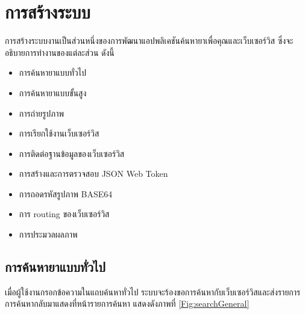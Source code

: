 \chapter{การสร้างระบบ}
การสร้างระบบงานเป็นส่วนหนึ่งของการพัฒนาแอปพลิเคชันค้นหายาเพื่อคุณและเว็บเซอร์วิส ซึ่งจะอธิบายการทำงานของแต่ละส่วน ดังนี้
\begin{itemize}
	\item การค้นหายาแบบทั่วไป
  	\item การค้นหายาแบบขั้นสูง
  	\item การถ่ายรูปภาพ
  	\item	การเรียกใช้งานเว็บเซอร์วิส
  	\item	การติดต่อฐานข้อมูลของเว็บเซอร์วิส
  	\item	การสร้างและการตรวจสอบ JSON Web Token
	\item	การถอดรหัสรูปภาพ BASE64
	\item	การ routing ของเว็บเซอร์วิส
  	\item	การประมวลผลภาพ
\end{itemize}

\section{การค้นหายาแบบทั่วไป}

	เมื่อผู้ใช้งานกรอกข้อความในแถบค้นหาทั่วไป 
	ระบบจะร้องขอการค้นหากับเว็บเซอร์วิสและส่งรายการการค้นหากลับมาแสดงที่หน้ารายการค้นหา 
	แสดงดังภาพที่ \ref{Fig:searchGeneral}
	
